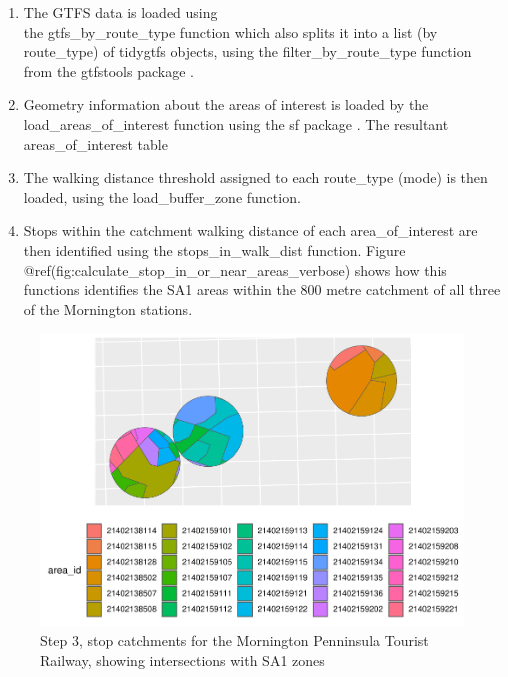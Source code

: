 \documentclass[preprint, 3p,
authoryear]{elsarticle} %
\begin{document}
\begin{enumerate}
\def\labelenumi{(\arabic{enumi})}
\item
  The GTFS data is loaded using\\
  the gtfs\_by\_route\_type function which also splits it into a list
  (by route\_type) of tidygtfs objects, using the
  filter\_by\_route\_type function from the gtfstools package
  \citep{filter_GTFS_by_mode}.
\item
  Geometry information about the areas of interest is loaded by the
  load\_areas\_of\_interest function using the sf package \citep{R-sf}.
  The resultant areas\_of\_interest table
\item
  The walking distance threshold assigned to each route\_type (mode) is
  then loaded, using the load\_buffer\_zone function.
\item
  Stops within the catchment walking distance of each area\_of\_interest
  are then identified using the stops\_in\_walk\_dist function. Figure
  @ref(fig:calculate\_stop\_in\_or\_near\_areas\_verbose) shows how this
  functions identifies the SA1 areas within the 800 metre catchment of
  all three of the Mornington stations.
\end{enumerate}

\begin{figure}
\includegraphics[width=1\linewidth]{Leveraging_GTFS_to_assess_transit_supply_Transport_Geography_files/figure-latex/calculate_stop_in_or_near_areas_verbose-1} \caption{Step 3, stop catchments for the Mornington Penninsula Tourist Railway, showing intersections with SA1 zones}\label{fig:calculate_stop_in_or_near_areas_verbose}
\end{figure}
\end{document}
